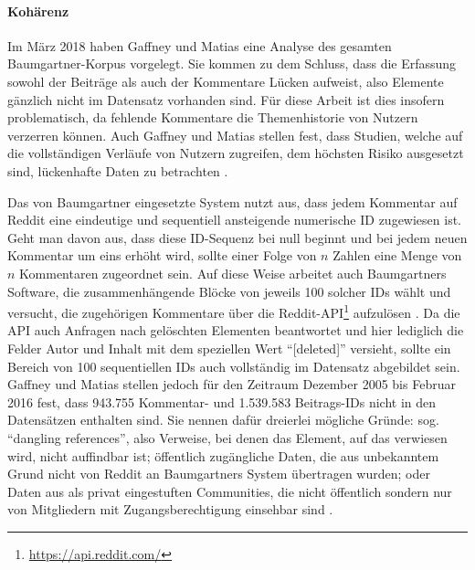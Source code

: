 \documentclass[11pt,a4paper,twoside]{article}
\let\rmarkdownfootnote\footnote%
\def\footnote{\protect\rmarkdownfootnote}
\let\oldpar\paragraph
\renewcommand{\paragraph}{\oldpar*}
\begin{document}
\hypertarget{koharenz}{%
\paragraph{Kohärenz}\label{koharenz}}

Im März 2018 haben Gaffney und Matias \autocite{Gaffney2018} eine
Analyse des gesamten Baumgartner-Korpus vorgelegt. Sie kommen zu dem
Schluss, dass die Erfassung sowohl der Beiträge als auch der Kommentare
Lücken aufweist, also Elemente gänzlich nicht im Datensatz vorhanden
sind. Für diese Arbeit ist dies insofern problematisch, da fehlende
Kommentare die Themenhistorie von Nutzern verzerren können. Auch Gaffney
und Matias stellen fest, dass Studien, welche auf die vollständigen
Verläufe von Nutzern zugreifen, dem höchsten Risiko ausgesetzt sind,
lückenhafte Daten zu betrachten \autocite{Gaffney2018}.

Das von Baumgartner eingesetzte System nutzt aus, dass jedem Kommentar
auf Reddit eine eindeutige und sequentiell ansteigende numerische ID
zugewiesen ist. Geht man davon aus, dass diese ID-Sequenz bei null
beginnt und bei jedem neuen Kommentar um eins erhöht wird, sollte einer
Folge von \(n\) Zahlen eine Menge von \(n\) Kommentaren zugeordnet sein.
Auf diese Weise arbeitet auch Baumgartners Software, die
zusammenhängende Blöcke von jeweils 100 solcher IDs wählt und versucht,
die zugehörigen Kommentare über die Reddit-API\footnote{\url{https://api.reddit.com/}}
aufzulösen \autocite{Baumgartner2018a}. Da die API auch Anfragen nach
gelöschten Elementen beantwortet und hier lediglich die Felder Autor und
Inhalt mit dem speziellen Wert \enquote{{[}deleted{]}} versieht, sollte
ein Bereich von 100 sequentiellen IDs auch vollständig im Datensatz
abgebildet sein. Gaffney und Matias stellen jedoch für den Zeitraum
Dezember 2005 bis Februar 2016 fest, dass 943.755 Kommentar- und
1.539.583 Beitrags-IDs nicht in den Datensätzen enthalten sind. Sie
nennen dafür dreierlei mögliche Gründe: sog. \enquote{dangling
references}, also Verweise, bei denen das Element, auf das verwiesen
wird, nicht auffindbar ist; öffentlich zugängliche Daten, die aus
unbekanntem Grund nicht von Reddit an Baumgartners System übertragen
wurden; oder Daten aus als privat eingestuften Communities, die nicht
öffentlich sondern nur von Mitgliedern mit Zugangsberechtigung einsehbar
sind \autocite{Gaffney2018}.
\end{document}
